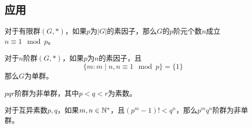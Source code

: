 \subsection{应用}

\begin{corollary}
	对于有限群$(G,*)$，如果$p$为$|G|$的素因子，那么$G$的$p$阶元个数$n$成立$n\equiv 1\mod p$。
\end{corollary}

\begin{corollary}
	对于$n$阶群$(G,*)$，如果$p$为$n$的素因子，且
	$$
	\{ m:m\mid n,n\equiv 1\mod p \}=\{1\}
	$$
	那么$G$为单群。
\end{corollary}

\begin{corollary}
	$pqr$阶群为非单群，其中$p<q<r$为素数。
\end{corollary}

\begin{corollary}
	对于互异素数$p,q$，如果$m,n\in\mathbb{N}^*$，且$(p^m-1)!<q^n$，那么$p^mq^n$阶群为非单群。
\end{corollary}

